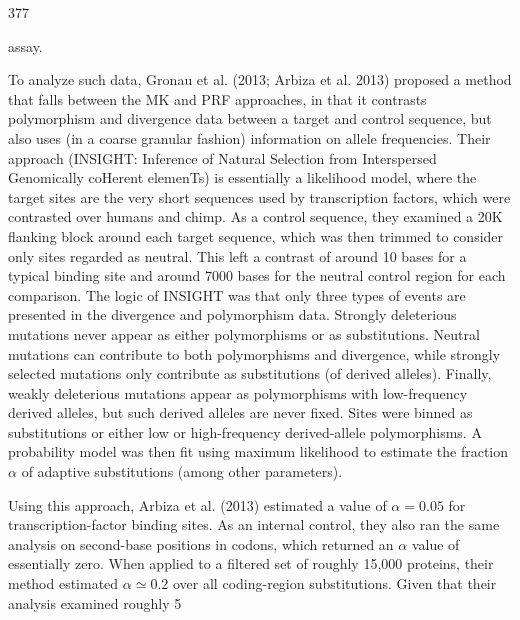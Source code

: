 \documentclass{article}
\begin{document}
377

assay.

To analyze such data, Gronau et al. (2013; Arbiza et al. 2013) proposed a method that falls between the MK and PRF approaches, in that it contrasts polymorphism and divergence data between a target and control sequence, but also uses (in a coarse granular fashion) information on allele frequencies. Their approach (INSIGHT: Inference of Natural Selection from Interspersed Genomically coHerent elemenTs) is essentially a likelihood model, where the target sites are the very short sequences used by transcription factors, which were contrasted over humans and chimp. As a control sequence, they examined a 20K flanking block around each target sequence, which was then trimmed to consider only sites regarded as neutral. This left a contrast of around 10 bases for a typical binding site and around 7000 bases for the neutral control region for each comparison. The logic of INSIGHT was that only three types of events are presented in the divergence and polymorphism data. Strongly deleterious mutations never appear as either polymorphisms or as substitutions. Neutral mutations can contribute to both polymorphisms and divergence, while strongly selected mutations only contribute as substitutions (of derived alleles). Finally, weakly deleterious mutations appear as polymorphisms with low-frequency derived alleles, but such derived alleles are never fixed. Sites were binned as substitutions or either low or high-frequency derived-allele polymorphisms. A probability model was then fit using maximum likelihood to estimate the fraction  $ \alpha $ of adaptive substitutions (among other parameters).

Using this approach, Arbiza et al. (2013) estimated a value of  $ \alpha = 0.05 $ for transcription-factor binding sites. As an internal control, they also ran the same analysis on second-base positions in codons, which returned an  $ \alpha $ value of essentially zero. When applied to a filtered set of roughly 15,000 proteins, their method estimated  $ \alpha \simeq 0.2 $ over all coding-region substitutions. Given that their analysis examined roughly 5%
\end{document}
